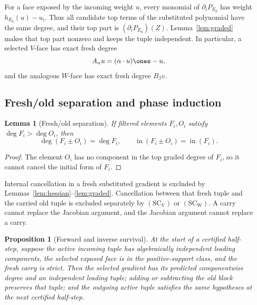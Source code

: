 \documentclass[11pt]{article}
\newtheorem{proposition}[theorem]{Proposition}
\newtheorem{lemma}[theorem]{Lemma}
\theoremstyle{definition}
\theoremstyle{remark}
\begin{document}
For a face exposed by the incoming weight \(u\), every monomial of
\(\partial_iP_{E_0}\) has weight \(h_{E_0}(u)-u_i\).  Thus all candidate
top terms of the substituted polynomial have the same degree, and their
top part is \((\partial_iP_{E_0})(Z)\).  Lemma~\ref{lem:graded} makes that
top part nonzero and keeps the tuple independent.  In particular, a
selected \(V\)-face has exact fresh degree
\[
 A_\alpha u=(\alpha\cdot u)\ones-u,
\]
and the analogous \(W\)-face has exact fresh degree \(B_\beta v\).

\subsection{Fresh/old separation and phase induction}

\begin{lemma}[Fresh/old separation]
\label{lem:fresh-old}
If filtered elements \(F_i,O_i\) satisfy
\(\deg F_i>\deg O_i\), then
\[
 \deg(F_i\pm O_i)=\deg F_i,\qquad
 \operatorname{in}(F_i\pm O_i)=\operatorname{in}(F_i).
\tag{4.6}
\]
\end{lemma}

\begin{proof}
The element \(O_i\) has no component in the top graded degree of \(F_i\),
so it cannot cancel the initial form of \(F_i\).
\end{proof}

Internal cancellation in a fresh substituted gradient is excluded by
Lemmas~\ref{lem:hessian}--\ref{lem:graded}.  Cancellation between that
fresh tuple and the carried old tuple is excluded separately by
\(\mathrm{(SC_V)}\) or \(\mathrm{(SC_W)}\).  A carry cannot replace the
Jacobian argument, and the Jacobian argument cannot replace a carry.

\begin{proposition}[Forward and inverse survival]
\label{prop:survival}
At the start of a certified half-step, suppose the active incoming tuple has
algebraically independent leading components, the selected exposed face is
in the positive-support class, and the fresh carry is strict.  Then the
selected gradient has its predicted componentwise degree and an independent
leading tuple; adding or subtracting the old block preserves that tuple;
and the outgoing active tuple satisfies the same hypotheses at the next
certified half-step.
\end{proposition}
\end{document}

